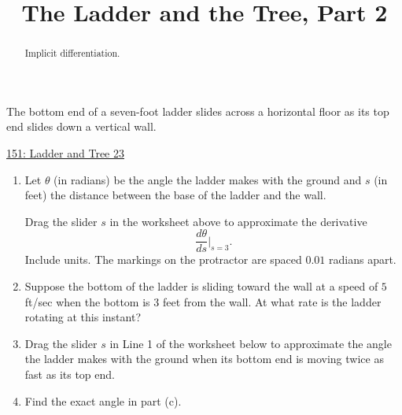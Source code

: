\documentclass{ximera}
\title{The Ladder and the Tree, Part 2}
\begin{document}
\begin{abstract}
Implicit differentiation.
\end{abstract}
\maketitle

\begin{question}  \label{Qhfhghllllgg}
The bottom end of a seven-foot ladder slides across a horizontal floor as its top end slides down a vertical wall.

\begin{onlineOnly}
   \begin{center}
\end{center}
\end{onlineOnly}

\href{https://www.desmos.com/calculator/4nmxshey0e}{151: Ladder and Tree 23}  %

\begin{enumerate}

\item Let $\theta$ (in radians) be the angle the ladder makes with the ground and $s$ (in feet) the distance between the base of the ladder and the wall.

Drag the slider $s$ in the worksheet above to approximate the derivative
\[
   \frac{d\theta}{ds}\Big|_{s=3} .
\]
Include units. The markings on the protractor are spaced $0.01$ radians apart.

\item Suppose the bottom of the ladder is sliding toward the wall at a speed of $5$ ft/sec when the bottom is $3$ feet from the wall. At what rate is the ladder rotating at this instant?

\item Drag the slider $s$ in Line 1 of the worksheet below to approximate the angle the ladder makes with the ground when its bottom end is moving twice as fast as its top end.

\item Find the exact angle in part (c).
\end{enumerate}

 


\end{question}
\end{document}
